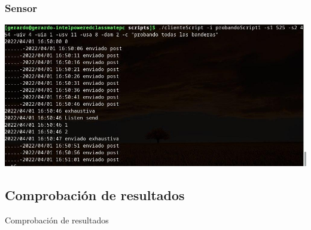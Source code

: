 \documentclass{beamer}
\begin{document}
\begin{frame}
    \frametitle{Sensor}
    \begin{table}
        \includegraphics[width=0.9\linewidth]{../images/diapositivas/scriptSensor.jpg}
    \end{table}
\end{frame}


\subsection{Comprobación de resultados}

\begin{frame}
    \huge
    Comprobación de resultados
\end{frame}
\end{document}
